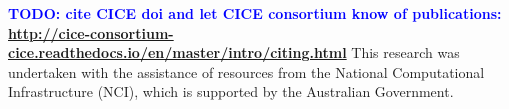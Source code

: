 \documentclass[gmd, manuscript]{copernicus}
\newcommand{\TODO}[1]{\textcolor{blue}{\textsf{\textbf{TODO: #1}}}}
\begin{document}
\begin{acknowledgements}
\TODO{cite CICE doi and let CICE consortium know of publications: \url{http://cice-consortium-cice.readthedocs.io/en/master/intro/citing.html}}
This research was undertaken with the assistance of resources from the National Computational Infrastructure (NCI), which is supported by the Australian Government.

\end{acknowledgements}









\end{document}
